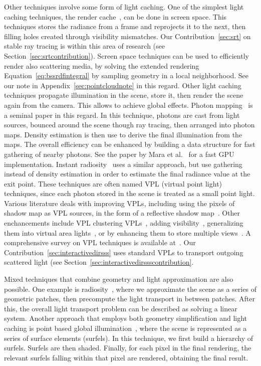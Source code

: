 Other techniques involve some form of light caching. One of the simplest light caching techniques, the render cache~\cite{Walter2002}, can be done in screen space. This techniques stores the radiance from a frame and reprojects it to the next, then filling holes created through visibility mismatches. Our Contribution~\ref{sec:srt} on stable ray tracing is within this area of research (see Section~\ref{sec:srtcontribution}). Screen space techniques can be used to efficiently render also scattering media, by solving the extended rendering Equation~\ref{eq:bssrdfintegral} by sampling geometry in a local neighborhood. See our note in Appendix~\ref{sec:pointcloudnote} in this regard. Other light caching techniques propagate illumination in the scene, store it, then render the scene again from the camera. This allows to achieve global effects. Photon mapping~\cite{Jensen1996} is a seminal paper in this regard. In this technique, photons are cast from light sources, bounced around the scene though ray tracing, then arranged into photon maps. Density estimation is then use to derive the final illumination from the maps. The overall efficiency can be enhanced by building a data structure for fast gathering of nearby photons. See the paper by Mara et al.~\cite{Mara2013} for a fast GPU implementation. Instant radiosity~\cite{Keller1997} uses a similar approach, but use gathering instead of density estimation in order to estimate the final radiance value at the exit point. These techniques are often named VPL (virtual point light) techniques, since each photon stored in the scene is treated as a small point light. Various literature deals with improving VPLs, including using the pixels of shadow map as VPL sources, in the form of a reflective shadow map~\cite{Dachsbacher2005}. Other enchancements include VPL clustering VPLs~\cite{Walter2005, Bus2015}, adding visibility~\cite{Ritschel2008}, generalizing them into virtual area lights~\cite{Dong09}, or by enhancing them to store multiple views~\cite{Simon2015}. A comprehensive survey on VPL techniques is available at~\cite{Dachsbacher2014}. Our Contribution~\ref{sec:interactivedirsss} uses standard VPLs to transport outgoing scattered light (see Section~\ref{sec:interactivedirssscontribution}.

Mixed techniques that combine geometry and light approximation are also possible. One example is radiosity~\cite{Goral1984}, where we approximate the scene as a series of geometric patches, then precompute the light transport in between patches. After this, the overall light transport problem can be described as solving a linear system. Another approach that employs both geometry simplification and light caching is point based global illumination~\cite{Christensen2008}, where the scene is represented as a series of surface elements (surfels). In this technique, we first build a hierarchy of surfels. Surfels are then shaded. Finally, for each pixel in the final rendering, the relevant surfels falling within that pixel are rendered, obtaining the final result. 

